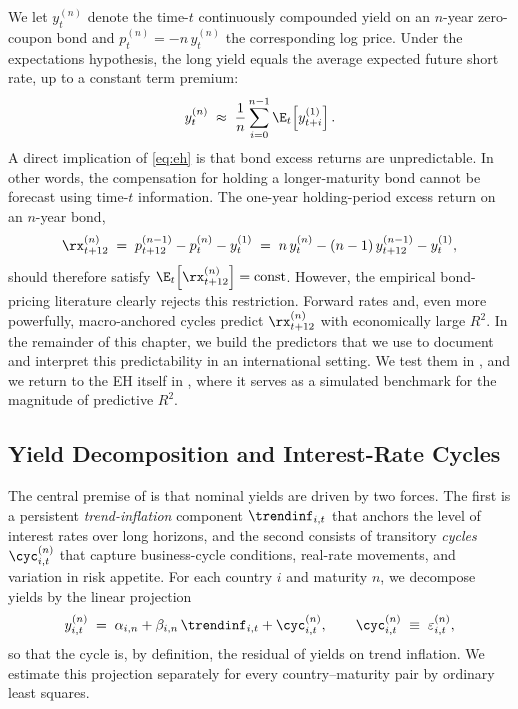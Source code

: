 We let $y^{(n)}_{t}$ denote the time-$t$ continuously compounded yield on an
$n$-year zero-coupon bond and $p^{(n)}_{t}=-n\,y^{(n)}_{t}$ the corresponding log
price. Under the expectations hypothesis, the long yield equals the average
expected future short rate, up to a constant term premium:
\begin{equation}
  y^{(n)}_{t} \;\approx\; \frac{1}{n}\sum_{i=0}^{n-1}\E_{t}\!\left[y^{(1)}_{t+i}\right].
  \label{eq:eh}
\end{equation}
A direct implication of \eqref{eq:eh} is that bond excess returns are
unpredictable. In other words, the compensation for holding a longer-maturity
bond cannot be forecast using time-$t$ information. The one-year
holding-period excess return on an $n$-year bond,
\begin{equation}
  \rx^{(n)}_{t+12} \;=\; p^{(n-1)}_{t+12}-p^{(n)}_{t}-y^{(1)}_{t}
                  \;=\; n\,y^{(n)}_{t}-(n-1)\,y^{(n-1)}_{t+12}-y^{(1)}_{t},
  \label{eq:rx}
\end{equation}
should therefore satisfy $\E_{t}\!\left[\rx^{(n)}_{t+12}\right]=\text{const}$.
However, the empirical bond-pricing literature clearly rejects this
restriction. Forward rates \citep{cochrane2005} and, even more powerfully,
macro-anchored cycles \citep{cieslak2015} predict $\rx^{(n)}_{t+12}$ with
economically large $R^{2}$. In the remainder of this chapter, we build the
predictors that we use to document and interpret this predictability in an
international setting. We test them in , and we return to the
EH itself in , where it serves as a simulated benchmark for
the magnitude of predictive $R^{2}$.

\subsection{Yield Decomposition and Interest-Rate Cycles}
\label{sec:fw-decomp}

The central premise of \citet{cieslak2015} is that nominal yields are driven by
two forces. The first is a persistent \emph{trend-inflation} component
$\trendinf_{i,t}$ that anchors the level of interest rates over long horizons,
and the second consists of transitory \emph{cycles} $\cyc^{(n)}_{i,t}$ that
capture business-cycle conditions, real-rate movements, and variation in risk
appetite. For each country $i$ and maturity $n$, we decompose yields by the
linear projection
\begin{equation}
  y^{(n)}_{i,t} \;=\; \alpha_{i,n} + \beta_{i,n}\,\trendinf_{i,t}
                    + \cyc^{(n)}_{i,t},
  \qquad
  \cyc^{(n)}_{i,t} \;\equiv\; \varepsilon^{(n)}_{i,t},
  \label{eq:decomp}
\end{equation}
so that the cycle is, by definition, the residual of yields on trend inflation.
We estimate this projection separately for every country--maturity pair by
ordinary least squares.

